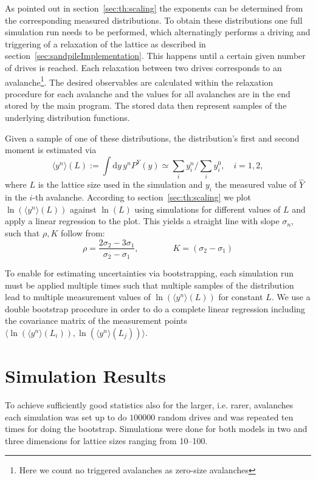 As pointed out in section~\ref{sec:th:scaling} the exponents can be determined from the corresponding measured
distributions. To obtain these distributions one full simulation run needs to be performed, which alternatingly performs
a driving and triggering of a relaxation of the lattice as described in section~\ref{sec:sandpileImplementation}.
This happens until a certain given number of drives is reached. Each relaxation between two drives corresponds to an
avalanche\footnote{Here we count no triggered avalanches as zero-size avalanches}. The desired observables are
calculated within the relaxation procedure for each avalanche and the values for all avalanches are in the end stored
by the main program. The stored data then represent samples of the underlying distribution functions.

Given a sample of one of these distributions, the distribution's first and second moment is estimated via
\begin{equation}
\langle y^n\rangle(L) := \int\!\mathrm{d}y\, y^n P^{Y}(y) \simeq \sum_i y_i^n \Big/ \sum_i y_i^0,\quad i=1,2,
\end{equation}
where $L$ is the lattice size used in the simulation and $y_i$ the measured value of $\hat{Y}$ in the $i$-th avalanche.
According to section~\ref{sec:th:scaling} we plot $\ln\left(\langle y^n\rangle(L)\right)$ against $\ln\left(L\right)$
using simulations for different values of $L$ and apply a linear regression to the plot. This yields a straight line
with slope $\sigma_n$, such that $\rho, K$ follow from:
\begin{equation}
\rho = \frac{2\sigma_2 - 3\sigma_1}{\sigma_2 - \sigma_1}, \qquad\qquad K = (\sigma_2-\sigma_1)
\end{equation}

To enable for estimating uncertainties via bootstrapping, each simulation run must be applied multiple times such that
multiple samples of the distribution lead to multiple measurement values of $\ln\left(\langle y^n\rangle(L)\right)$
for constant $L$. We use a double bootstrap procedure in order to do a complete linear regression
including the covariance matrix of the measurement points
$\langle\ln\left(\langle y^n\rangle(L_i)\right), \ln\left(\langle y^n\rangle(L_j)\right)\rangle$.


\section{Simulation Results}
\label{sec:results}
To achieve sufficiently good statistics also for the larger, i.e. rarer, avalanches each simulation was set up to
do $100000$ random drives and was repeated ten times for doing the bootstrap. Simulations were done for both models
in two and three dimensions for lattice sizes ranging from \SIrange{10}{100}{}.

